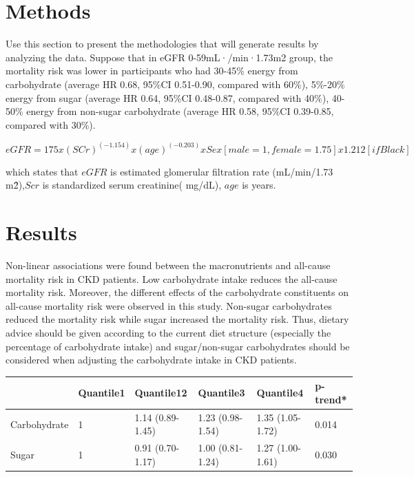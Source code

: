 \documentclass[12pt]{article}
\begin{document}
\section{Methods}
\label{sec:meth}

Use this section to present the methodologies that will generate results by analyzing the data. Suppose that in eGFR 0-59mL·/min·1.73m2 group, the mortality risk was lower in participants who had 30-45\% energy from carbohydrate (average HR 0.68, 95\%CI 0.51-0.90, compared with 60\%), 5\%-20\% energy from sugar (average HR 0.64, 95\%CI 0.48-0.87, compared with 40\%), 40-50\% energy from non-sugar carbohydrate (average HR 0.58, 95\%CI 0.39-0.85, compared with 30\%). 



\begin{equation}
eGFR = 175 x (SCr)^(-1.154) x(age)^(-0.203) xSex[male=1,female=1.75] x1.212 [if Black]
\end{equation}

which states that $eGFR$ is estimated glomerular filtration rate (mL/min/1.73 m\^2),$Scr$ is standardized serum creatinine( mg/dL), $age$ is years.



\section{Results}
\label{sec:resu}

Non-linear associations were found between the macronutrients and all-cause mortality risk in CKD patients. Low carbohydrate intake reduces the all-cause mortality risk. Moreover, the different effects of the carbohydrate constituents on all-cause mortality risk were observed in this study. Non-sugar carbohydrates reduced the mortality risk while sugar increased the mortality risk. Thus, dietary advice should be given according to the current diet structure (especially the percentage of carbohydrate intake) and sugar/non-sugar carbohydrates should be considered when adjusting the carbohydrate intake in CKD patients.

\vspace{\baselineskip}
\vspace{\baselineskip}
\begin{tabular}{|l|l|l|l|l||l|}
\hline
     & Quantile1 & Quantile12 & Quantile3 & Quantile4 & p-trend* \\ 
\hline
    Carbohydrate & 1 & 1.14 (0.89-1.45) & 1.23 (0.98-1.54) & 1.35 (1.05-1.72) & 0.014 \\ 
  Sugar & 1 & 0.91 (0.70-1.17) & 1.00 (0.81-1.24) & 1.27 (1.00-1.61) & 0.030\\ 
\hline
\end{tabular}
\vspace{\baselineskip}
\end{document}
